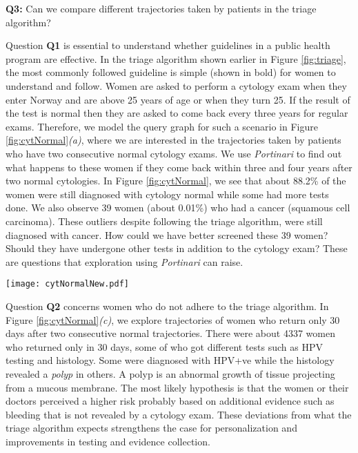 \documentclass[10pt, conference]{IEEEtran}
\begin{document}
\noindent \textbf{Q3:} Can we compare different trajectories taken by patients in the triage algorithm?

Question \textbf{Q1} is  essential to understand whether guidelines in a public health program are effective. In the triage algorithm shown earlier in Figure \ref{fig:triage}, the most commonly followed guideline is simple (shown in bold) for women to understand and follow. Women are asked to perform a cytology exam when they enter Norway and are above 25 years of age or when they turn 25. If the result of the test is normal then they are asked to come back every three years for regular exams. Therefore, we model the query graph for such a scenario in Figure \ref{fig:cytNormal}\textit{(a)}, where we are interested in the trajectories taken by patients who have two consecutive normal cytology exams. We use \textit{Portinari} to find out what happens to these women if they come back within three and four years after two normal cytologies. In Figure \ref{fig:cytNormal}, we see that about 88.2\% of the women were still diagnosed with cytology normal while some had more tests done. We also observe 39 women (about 0.01\%) who had a cancer (squamous cell carcinoma). These outliers despite following the triage algorithm, were still diagnosed with cancer. How could we have better screened these 39 women? Should they have undergone other tests in addition to the cytology exam? These are questions that exploration using \textit{Portinari} can raise.

\begin{figure*}[t]
\texttt{[image: cytNormalNew.pdf]}
\caption{ \textit{(a)}  Query graph for women with two consecutive normal cytologies \textit{(b)}  Trajectory of women who come back in 3 to 4 years after two normal cytology exams  \textit{(c)} Trajectory of women with two consecutive normal cytologies but return in just 30 days.}
\label{fig:cytNormal}
\end{figure*}

Question \textbf{Q2} concerns women who do not adhere to the triage algorithm. In Figure \ref{fig:cytNormal}\textit{(c)}, we explore trajectories of women who return only 30 days after two consecutive normal trajectories. There were about 4337 women who returned only in 30 days, some of who got different tests such as HPV testing and histology. Some were diagnosed with HPV+ve while the histology revealed a \emph{polyp} in others. A polyp is an abnormal growth of tissue projecting from a mucous membrane. The most likely hypothesis is that the women or their doctors perceived a higher risk probably based on additional evidence such as bleeding that is not revealed by a cytology exam. These deviations from what the triage algorithm expects strengthens the case for personalization and improvements in testing and evidence collection.
\end{document}

